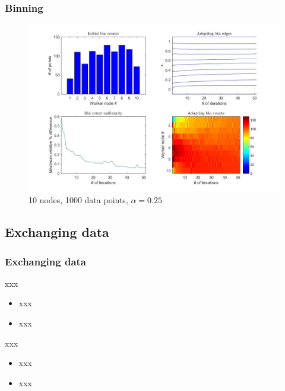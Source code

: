\documentclass{beamer}
\begin{document}
\begin{frame}
	\frametitle{Binning}
	
	\begin{figure}[!htb]
		\centering
		\vspace{-5pt}
		\includegraphics[scale = 0.25]{AdaptiveBinning_10Nodes_1000Lines_0250alpha}
		\vspace{-10pt}
		\caption{10 nodes, 1000 data points, $\alpha = 0.25$}
	\end{figure}
\end{frame}



\subsection{Exchanging data}

\begin{frame}	
	\frametitle{Exchanging data}
	
	\begin{block}{xxx}
		\begin{itemize}
			\item xxx
			\item xxx
		\end{itemize}
	\end{block}
	
	\begin{block}{xxx}
		\begin{itemize}
			\item xxx
			\item xxx
		\end{itemize}
	\end{block}
\end{frame}
\end{document}
